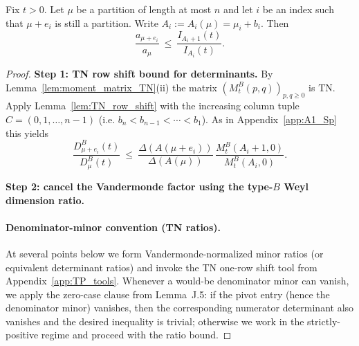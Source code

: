 \begin{lemma}
\label{lem:SOodd_one_box}
Fix $t>0$.
Let $\mu$ be a partition of length at most $n$ and let $i$ be an index such that $\mu+e_i$ is still a partition.
Write $A_i:=A_i(\mu)=\mu_i+b_i$.
Then
\begin{equation}
\label{eq:SOodd_one_box_bound}
\frac{a_{\mu+e_i}}{a_{\mu}}\ \le\ \frac{I_{A_i+1}(t)}{I_{A_i}(t)}.
\end{equation}
\end{lemma}

\begin{proof}
\textbf{Step 1: TN row shift bound for determinants.}
By Lemma~\ref{lem:moment_matrix_TN}(ii) the matrix $(M_t^{B}(p,q))_{p,q\ge 0}$ is TN.
Apply Lemma~\ref{lem:TN_row_shift} with the increasing column tuple $C=(0,1,\dots,n-1)$
(i.e. $b_n<b_{n-1}<\cdots<b_1$).
As in Appendix~\ref{app:A1_Sp} this yields
\begin{equation}
\label{eq:SOodd_det_shift}
\frac{D^{B}_{\mu+e_i}(t)}{D^{B}_{\mu}(t)}
\ \le\ \frac{\Delta(A(\mu+e_i))}{\Delta(A(\mu))}\,\frac{M_t^{B}(A_i+1,0)}{M_t^{B}(A_i,0)}.
\end{equation}

\textbf{Step 2: cancel the Vandermonde factor using the type-$B$ Weyl dimension ratio.}

\paragraph{Denominator-minor convention (TN ratios).}
At several points below we form Vandermonde-normalized minor ratios (or equivalent determinant ratios) and invoke the TN one-row shift tool from Appendix~\ref{app:TP_tools}.
Whenever a would-be denominator minor can vanish, we apply the zero-case clause from Lemma~J.5:
if the pivot entry (hence the denominator minor) vanishes, then the corresponding numerator determinant also vanishes and the desired inequality is trivial; otherwise we work in the strictly-positive regime and proceed with the ratio bound.




\end{proof}
